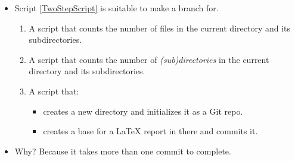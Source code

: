 \begin{frame}
  \begin{solution}
    \begin{itemize}
      \item Script \ref{TwoStepScript} is suitable to make a branch for.
        \begin{enumerate}
          \item A script that counts the number of files in the current 
            directory and its subdirectories.
          \item A script that counts the number of \emph{(sub)directories} in 
            the current directory and its subdirectories.
          \item \label{TwoStepScript} A script that:
            \begin{itemize}
              \item creates a new directory and initializes it as a Git 
                repo.
              \item creates a base for a LaTeX report in there and commits 
                it.
            \end{itemize}
        \end{enumerate}
      \item Why?
        Because it takes more than one commit to complete.
    \end{itemize}
  \end{solution}
\end{frame}

